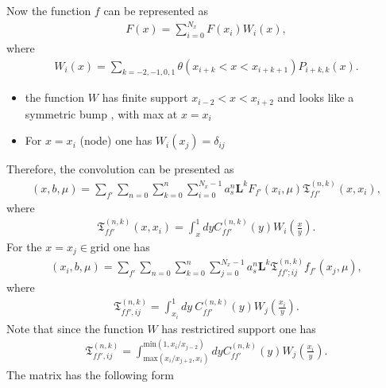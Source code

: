 \documentclass[prd,nofootinbib,eqsecnum,final]{revtex4}
\renewcommand{\(}{\left(}
\renewcommand{\)}{\right)}
\renewcommand{\[}{\left[}
\renewcommand{\]}{\right]}
\begin{document}
Now the function $f$ can be represented as
\begin{eqnarray}
F(x)=\sum_{i=0}^{N_x}F(x_i)W_i(x),
\end{eqnarray}
where 
\begin{eqnarray}
W_i(x)=\sum_{k=-2,-1,0,1}\theta(x_{i+k}<x<x_{i+k+1})P_{i+k,k}(x).
\end{eqnarray}
\begin{itemize}
\item the function $W$ has finite support $x_{i-2}<x<x_{i+2}$ and looks like a symmetric bump , with max at $x=x_i$
\item For $x=x_i$ (node) one has $W_i(x_j)=\delta_{ij}$
\end{itemize}
Therefore, the convolution can be presented as
\begin{eqnarray}
[C\otimes f](x,b,\mu)=\sum_{f'} \sum_{n=0}\sum_{k=0}^n \sum_{i=0}^{N_x-1} a_s^n \mathbf{L}^k F_{f'}(x_i,\mu) 
\mathfrak{T}_{ff'}^{(n,k)}(x,x_i),
\end{eqnarray}
where
\begin{eqnarray}
\mathfrak{T}_{ff'}^{(n,k)}(x,x_i)=\int_x^1 dy C^{(n,k)}_{ff'}(y)W_i\(\frac{x}{y}\).
\end{eqnarray}
For the $x=x_j \in $grid one has
\begin{eqnarray}
[C\otimes f](x_i,b,\mu)=\sum_{f'} \sum_{n=0}\sum_{k=0}^n \sum_{j=0}^{N_x-1} a_s^n \mathbf{L}^k  \mathfrak{T}_{ff';ij}^{(n,k)} f_{f'}(x_j,\mu) 
,
\end{eqnarray}
where
\begin{eqnarray}
\mathfrak{T}_{ff',ij}^{(n,k)}=\int_{x_i}^1 dy~C^{(n,k)}_{ff'}(y)W_j\(\frac{x_i}{y}\).
\end{eqnarray}
Note that since the function $W$ has restrictired support one has
\begin{eqnarray}
\mathfrak{T}_{ff',ij}^{(n,k)}=
\int^{\text{min}(1,x_i/x_{j-2})}_{\text{max}(x_i/x_{j+2},x_i)} dy C^{(n,k)}_{ff'}(y)W_j\(\frac{x_i}{y}\).
\end{eqnarray}
The matrix has the following form
\end{document}
